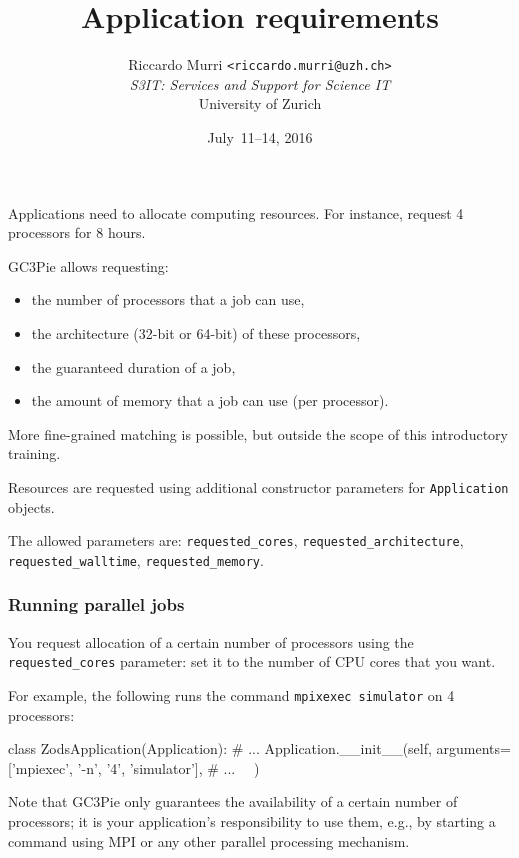 \documentclass[english,serif,mathserif,xcolor=pdftex,dvipsnames,table]{beamer}
\title[Requirements]{%
  Application requirements
}
\author[R. Murri, S3IT UZH]{%
  Riccardo Murri \texttt{<riccardo.murri@uzh.ch>}
  \\[1ex]
  \emph{S3IT: Services and Support for Science IT}
  \\[1ex]
  University of Zurich
}
\date{July~11--14, 2016}
\begin{document}
\maketitle


\begin{frame}
  Applications need to allocate computing resources.
  For instance, request 4 processors for 8 hours.

  \+
  GC3Pie allows requesting:
  \begin{itemize}
  \item the number of processors that a job can use,
  \item the architecture (32-bit or 64-bit) of these processors,
  \item the guaranteed duration of a job,
  \item the amount of memory that a job can use (per processor).
  \end{itemize}

  \+
  More fine-grained matching is possible, but outside the scope of
  this introductory training.
\end{frame}


\begin{frame}[fragile]
  Resources are requested using additional constructor parameters for
  \texttt{Application} objects.

  \+
  The allowed parameters are:
  \lstinline|requested_cores|,
  \lstinline|requested_architecture|,
  \lstinline|requested_walltime|,
  \lstinline|requested_memory|.
\end{frame}


\begin{frame}[fragile]
  \frametitle{Running parallel jobs}

  You request allocation of a certain number of processors using the
  \lstinline|requested_cores| parameter: set it to the number of CPU
  cores that you want.

  \+
  For example, the following runs the command \texttt{mpixexec
    simulator} on 4 processors:
  \begin{python}
  class ZodsApplication(Application):
    # ...
    Application.__init__(self,
      arguments=['mpiexec', '-n', '4', 'simulator'],
      # ...
      ~~)
  \end{python}

  \+
  {\small Note that GC3Pie only guarantees the availability of a certain
    number of processors; it is your application's responsibility to use
    them, e.g., by starting a command using MPI or any other parallel
    processing mechanism.}
\end{frame}
\end{document}
